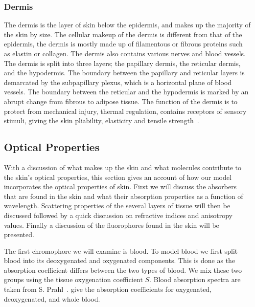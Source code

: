 \subsubsection*{Dermis} %
\label{sub:dermis}
The dermis is the layer of skin below the epidermis, and makes up the majority of the skin by size.
The cellular makeup of the dermis is different from that of the epidermis, the dermis is mostly made up of filamentous or fibrous proteins such as elastin or collagen.
The dermis also contains various nerves and blood vessels.
The dermis is split into three layers; the papillary dermis, the reticular dermis, and the hypodermis.
The boundary between the papillary and reticular layers is demarcated by the subpapillary plexus, which is a horizontal plane of blood vessels.
The boundary between the reticular and the hypodermis is marked by an abrupt change from fibrous to adipose tissue.
The function of the dermis is to protect from mechanical injury, thermal regulation, contains receptors of sensory stimuli, giving the skin pliability, elasticity and tensile strength~\cite{freedberg1999fitzpatrick,zaidi2010dermatology}.
 


\subsection{Optical Properties} %
\label{sub:optical_properties}



With a discussion of what makes up the skin and what molecules contribute to the skin's optical properties, this section gives an account of how our model incorporates the optical properties of skin.
First we will discuss the absorbers that are found in the skin and what their absorption properties as a function of wavelength.
Scattering properties of the several layers of tissue will then be discussed followed by a quick discussion on refractive indices and anisotropy values.
Finally a discussion of the fluorophores found in the skin will be presented.

\medskip

The first chromophore we will examine is blood.
To model blood we first split blood into its deoxygenated and oxygenated components.
This is done as the absorption coefficient differs between the two types of blood. We mix these two groups using the tissue oxygenation coefficient $S$. Blood absorption spectra are taken from S. Prahl~\cite{prahlblood}.
 give the absorption coefficients for oxygenated, deoxygenated, and whole blood.


